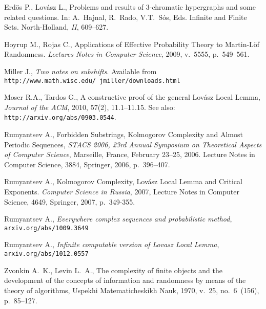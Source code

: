 \documentclass[12pt]{article}
\begin{document}
\begin{thebibliography}{9}

Erd\"os P., Lov\'asz L., Problems and results of 3-chromatic hypergraphs and some related questions. In: A.~Hajnal, R.~Rado, V.T.~S\'os, Eds. Infinite and Finite Sets. North-Holland, \emph{II}, 609--627.

Hoyrup M., Rojas C., Applications of Effective Probability Theory to Martin-L\"of Randomness. \emph{Lectures Notes in Computer Science}, 2009, v.~5555, p.~549--561.

 Miller J.,
 \emph{Two notes on subshifts}. Available from\\
 \texttt{http://www.math.wisc.edu/~jmiller/downloads.html}

Moser R.A., Tardos G., A constructive proof of the general Lov\'asz Local Lemma, \emph{Journal of the ACM}, 2010,  57(2), 11.1--11.15. See also:\\ \texttt{http://arxiv.org/abs/0903.0544}.


 Rumyantsev A.,
 Forbidden Substrings, Kolmogorov Complexity and Almost Periodic Sequences,
 \emph{STACS 2006, 23rd Annual Symposium on Theoretical Aspects of Computer Science},
 Marseille, France, February 23--25, 2006. Lecture Notes in Computer Science,
 3884, Springer, 2006, p.~396--407.

 Rumyantsev A.,
 Kolmogorov Complexity, Lov{\'a}sz Local Lemma and Critical Exponents.
 \emph{Computer Science in Russia}, 2007, Lecture Notes in Computer Science, 4649,
 Springer, 2007, p.~349-355.

Rumyantsev A., \emph{Everywhere complex sequences and probabilistic method},\\ \texttt{arxiv.org/abs/1009.3649}

Rumyantsev A., \emph{Infinite computable version of Lovasz Local Lemma},\\ \texttt{arxiv.org/abs/1012.0557
}

Zvonkin A.~K., Levin L.~A., The complexity of finite objects and the development of the concepts of information and randomness by means of the theory of algorithms, Uspekhi Matematicheskikh Nauk, 1970, v.~25, no.~6~(156), p.~85--127.


\end{thebibliography}
\end{document}

